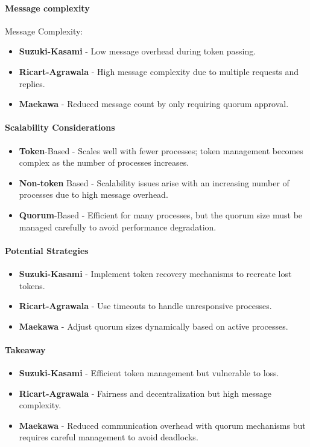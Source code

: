 \paragraph*{Message complexity}
Message Complexity:
\begin{itemize}
	\item \textbf{Suzuki-Kasami} - Low message overhead during token passing.
	\item \textbf{Ricart-Agrawala} - High message complexity due to multiple
requests and replies.
	\item \textbf{Maekawa} - Reduced message count by only requiring
quorum approval.
\end{itemize}

\paragraph*{Scalability Considerations}

\begin{itemize}
   \item \textbf{Token}-Based - Scales well with fewer processes; token management becomes complex as the number of processes increases.
   
   \item \textbf{Non-token} Based - Scalability issues arise with an increasing number of processes due to high message overhead.
   
   \item \textbf{Quorum}-Based - Efficient for many processes, but the quorum size must be managed carefully to avoid performance degradation.
\end{itemize}

\paragraph*{Potential Strategies}

\begin{itemize}
	\item \textbf{Suzuki-Kasami} - Implement token recovery mechanisms to recreate lost tokens.
	\item \textbf{Ricart-Agrawala} - Use timeouts to handle unresponsive processes.
	\item \textbf{Maekawa} - Adjust quorum sizes dynamically based on active processes.
\end{itemize}

\paragraph*{Takeaway}

\begin{itemize}
	\item \textbf{Suzuki-Kasami} - Efficient token management but vulnerable to loss.
	\item \textbf{Ricart-Agrawala} - Fairness and decentralization but high message complexity.
	\item \textbf{Maekawa} - Reduced communication overhead with quorum mechanisms but requires careful management to avoid deadlocks.
\end{itemize}